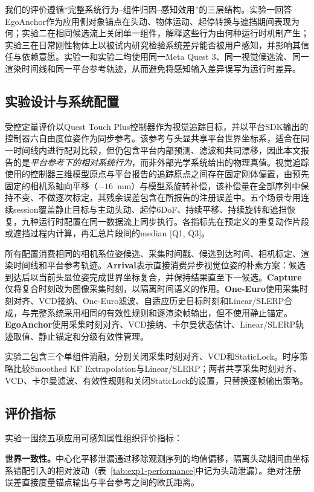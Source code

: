 \documentclass[review]{vgtc}
\begin{document}
我们的评价遵循“完整系统行为--组件归因--感知效用”的三层结构。实验一回答EgoAnchor作为应用侧对象锚点在头动、物体运动、起停转换与遮挡期间表现为何；实验二在相同候选流上关闭单一组件，解释这些行为由何种运行时机制产生；实验三在日常刚性物体上以被试内研究检验系统差异能否被用户感知，并影响其信任与依赖意愿。实验一和实验二均使用同一Meta Quest 3、同一视觉候选流、同一渲染时间线和同一平台参考轨迹，从而避免将感知输入差异误写为运行时差异。

\subsection{实验设计与系统配置}

受控定量评价以Quest Touch Plus控制器作为视觉追踪目标，并以平台SDK输出的控制器六自由度位姿作为同步参考。该参考与头显共享平台世界坐标系，适合在同一时间线内进行配对比较，但仍包含平台内部预测、滤波和共同漂移，因此本文报告的是\emph{平台参考下的相对系统行为}，而非外部光学系统给出的物理真值。视觉追踪使用的控制器三维模型原点与平台报告的追踪原点之间存在固定刚体偏置，由预先固定的相机系轴向平移（$-16$~mm）与模型系旋转补偿，该补偿量在全部序列中保持不变、不做逐次标定，其残余误差包含在所报告的注册误差中。五个场景专用连续session覆盖静止目标与主动头动、起停6DoF、持续平移、持续旋转和遮挡恢复，九种运行时配置在同一数据流上同步执行。各指标先在预定义的重复动作片段或遮挡过程内计算，再汇总片段间的median [Q1, Q3]。

所有配置消费相同的相机系位姿候选、采集时间戳、候选到达时间、相机标定、渲染时间线和平台参考轨迹。\textbf{Arrival}表示直接消费异步视觉位姿的朴素方案：候选到达后以当前头显位姿完成世界坐标复合，并保持结果直至下一候选。\textbf{Capture}仅将复合时刻改为图像采集时刻，以隔离时间语义的作用。\textbf{One-Euro}使用采集时刻对齐、VCD接纳、One-Euro滤波、自适应历史目标时刻和Linear/SLERP合成，与完整系统采用相同的有效性规则和逐渲染帧输出，但不使用静止锚定。\textbf{EgoAnchor}使用采集时刻对齐、VCD接纳、卡尔曼状态估计、Linear/SLERP轨迹取值、静止锚定和分级有效性管理。

实验二包含三个单组件消融，分别关闭采集时刻对齐、VCD和StaticLock。时序策略比较Smoothed KF Extrapolation与Linear/SLERP；两者共享采集时刻对齐、VCD、卡尔曼滤波、有效性规则和关闭StaticLock的设置，只替换逐帧输出策略。

\subsection{评价指标}

实验一围绕五项应用可感知属性组织评价指标：

\textbf{世界一致性。}中心化平移泄漏通过移除观测序列的均值偏移，隔离头动期间由坐标系错配引入的相对波动（表~\ref{tab:exp1-performance}中记为头动泄漏）。绝对注册误差直接度量锚点输出与平台参考之间的欧氏距离。
\end{document}
